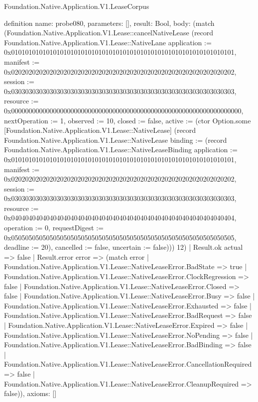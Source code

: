 \begin{lexlean}{Foundation.Native.Application.V1.LeaseCorpus}
\begin{semanticmodule}
definition{
  name: probe080,
  parameters: [],
  result: Bool,
  body: (match (Foundation.Native.Application.V1.Lease::cancelNativeLease (record Foundation.Native.Application.V1.Lease::NativeLane {application := 0x0101010101010101010101010101010101010101010101010101010101010101, manifest := 0x0202020202020202020202020202020202020202020202020202020202020202, session := 0x0303030303030303030303030303030303030303030303030303030303030303, resource := 0x000000000000000000000000000000000000000000000000000000000000000000, nextOperation := 1, observed := 10, closed := false, active := (ctor Option.some [Foundation.Native.Application.V1.Lease::NativeLease] (record Foundation.Native.Application.V1.Lease::NativeLease {binding := (record Foundation.Native.Application.V1.Lease::NativeLeaseBinding {application := 0x0101010101010101010101010101010101010101010101010101010101010101, manifest := 0x0202020202020202020202020202020202020202020202020202020202020202, session := 0x0303030303030303030303030303030303030303030303030303030303030303, resource := 0x0404040404040404040404040404040404040404040404040404040404040404, operation := 0, requestDigest := 0x0505050505050505050505050505050505050505050505050505050505050505, deadline := 20}), cancelled := false, uncertain := false}))}) 12)
    | Result.ok actual => false
    | Result.error error => (match error
      | Foundation.Native.Application.V1.Lease::NativeLeaseError.BadState => true
      | Foundation.Native.Application.V1.Lease::NativeLeaseError.ClockRegression => false
      | Foundation.Native.Application.V1.Lease::NativeLeaseError.Closed => false
      | Foundation.Native.Application.V1.Lease::NativeLeaseError.Busy => false
      | Foundation.Native.Application.V1.Lease::NativeLeaseError.Exhausted => false
      | Foundation.Native.Application.V1.Lease::NativeLeaseError.BadRequest => false
      | Foundation.Native.Application.V1.Lease::NativeLeaseError.Expired => false
      | Foundation.Native.Application.V1.Lease::NativeLeaseError.NoPending => false
      | Foundation.Native.Application.V1.Lease::NativeLeaseError.BadBinding => false
      | Foundation.Native.Application.V1.Lease::NativeLeaseError.CancellationRequired => false
      | Foundation.Native.Application.V1.Lease::NativeLeaseError.CleanupRequired => false)),
  axioms: []
}


\end{semanticmodule}
\end{lexlean}
